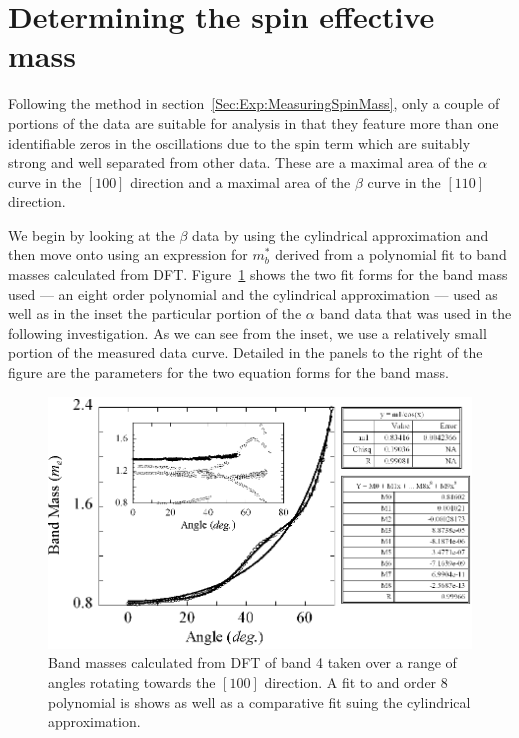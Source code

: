
\section{Determining the spin effective mass}

Following the method in section~\ref{Sec:Exp:MeasuringSpinMass}, only a couple of portions of the data are suitable for analysis in that they feature more than one identifiable zeros in the oscillations due to the spin term which are suitably strong and well separated from other data. These are a maximal area of the $\alpha$ curve in the $[100]$ direction and a maximal area of the $\beta$ curve in the $[110]$ direction.

We begin by looking at the $\beta$ data by using the cylindrical approximation and then move onto using an expression for $m^*_b$ derived from a polynomial fit to band masses calculated from \ac{DFT}. Figure~\ref{Fig:ResD:DFTBandMassBand4} shows the two fit forms for the band mass used --- an eight order polynomial and the cylindrical approximation --- used as well as in the inset the particular portion of the $\alpha$ band data that was used in the following investigation. As we can see from the inset, we use a relatively small portion of the measured data curve. Detailed in the panels to the right of the figure are the parameters for the two equation forms for the band mass.
\begin{figure}[htbp]
    \begin{center}
        \includegraphics[scale=0.9]{Chapter-dHvABaFe2P2/Figures/Mass/DFTBandMassBand4/DFTBandMassBand4}
        \caption{Band masses calculated from \ac{DFT} of band 4 taken over a range of angles rotating towards the $[100]$ direction. A fit to and order 8 polynomial is shows as well as a comparative fit suing the cylindrical approximation.}
        \label{Fig:ResD:DFTBandMassBand4}
    \end{center}
\end{figure}

